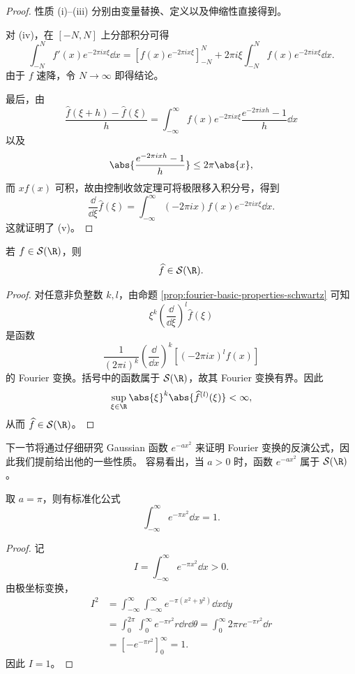\begin{proof}
性质 (i)--(iii) 分别由变量替换、定义以及伸缩性直接得到。

对 (iv)，在 \([-N,N]\) 上分部积分可得
\[
\int_{-N}^{N}f'(x)e^{-2\pi i x\xi}\dd x
=\left[f(x)e^{-2\pi i x\xi}\right]_{-N}^{N}
+2\pi i\xi\int_{-N}^{N}f(x)e^{-2\pi i x\xi}\dd x.
\]
由于 \(f\) 速降，令 \(N\to\infty\) 即得结论。

最后，由
\[
\frac{\widehat f(\xi+h)-\widehat f(\xi)}{h}
=\int_{-\infty}^{\infty}
 f(x)e^{-2\pi i x\xi}
 \frac{e^{-2\pi i xh}-1}{h}\dd x
\]
以及
\[
\abs{\frac{e^{-2\pi i xh}-1}{h}}\leq2\pi\abs{x},
\]
而 \(xf(x)\) 可积，故由控制收敛定理可将极限移入积分号，得到
\[
\frac{\dd}{\dd\xi}\widehat f(\xi)
=\int_{-\infty}^{\infty}(-2\pi ix)f(x)e^{-2\pi i x\xi}\dd x.
\]
这就证明了 (v)。
\end{proof}

\begin{theorem}\label{thm:fourier-preserves-schwartz}
若 \(f\in\mathcal S(\R)\)，则
\[
\widehat f\in\mathcal S(\R).
\]
\end{theorem}

\begin{proof}
对任意非负整数 \(k,l\)，由命题 \ref{prop:fourier-basic-properties-schwartz} 可知
\[
\xi^k\left(\frac{\dd}{\dd\xi}\right)^l\widehat f(\xi)
\]
是函数
\[
\frac{1}{(2\pi i)^k}
\left(\frac{\dd}{\dd x}\right)^k
\left[(-2\pi ix)^l f(x)\right]
\]
的 Fourier 变换。括号中的函数属于 \(\mathcal S(\R)\)，故其 Fourier 变换有界。因此
\[
\sup_{\xi\in\R}
\abs{\xi}^{k}
\abs{\widehat f^{(l)}(\xi)}<\infty,
\]
从而 \(\widehat f\in\mathcal S(\R)\)。
\end{proof}

下一节将通过仔细研究 Gaussian 函数 \(e^{-ax^2}\) 来证明 Fourier 变换的反演公式，因此我们提前给出他的一些性质。
容易看出，当 \(a>0\) 时，函数 \(e^{-ax^2}\) 属于 \(\mathcal S(\R)\)。

\begin{proposition}\label{prop:gaussian-normalization}
取 \(a=\pi\)，则有标准化公式
\[
\int_{-\infty}^{\infty}e^{-\pi x^2}\dd x=1.
\]
\end{proposition}

\begin{proof}
记
\[
I=\int_{-\infty}^{\infty}e^{-\pi x^2}\dd x>0.
\]
由极坐标变换，
\[
\begin{aligned}
I^2
&=\int_{-\infty}^{\infty}\int_{-\infty}^{\infty}
  e^{-\pi(x^2+y^2)}\dd x\dd y\\
&=\int_0^{2\pi}\int_0^{\infty}e^{-\pi r^2}r\dd r\dd\theta
 =\int_0^{\infty}2\pi r e^{-\pi r^2}\dd r\\
&=\left[-e^{-\pi r^2}\right]_{0}^{\infty}=1.
\end{aligned}
\]
因此 \(I=1\)。
\end{proof}

